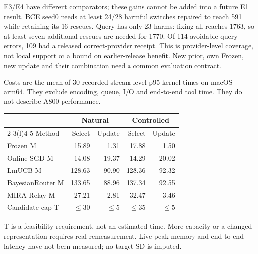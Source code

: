 \documentclass[10pt,letterpaper]{article}
\newcommand{\B}[1]{{\color{GuideBlue}#1}}
\newcommand{\note}[1]{{\fontsize{8.5}{10.5}\selectfont #1\par}}
\newcommand{\sect}[1]{\vspace{5pt}{\large\bfseries #1}\par\vspace{2pt}}
\newenvironment{clean}{\begin{center}\fontsize{9.5}{11.5}\selectfont\setlength{\tabcolsep}{6pt}\renewcommand{\arraystretch}{1.06}}{\end{center}}
\begin{document}
\note{E3/E4 have different comparators; these gains cannot be added into a future E1 result. BCE seed0 needs at least 24/28 harmful switches repaired to reach 591 while retaining its 16 rescues. Query has only 23 harms: fixing all reaches 1763, so at least seven additional rescues are needed for 1770. Of 114 avoidable query errors, 109 had a released correct-provider receipt. This is provider-level coverage, not local support or a bound on earlier-release benefit. New prior, own Frozen, new update and their combination need a common evaluation contract.}
\newpage
\sect{E5 / body Table 8: matched cost and feasibility}
Costs are the mean of 30 recorded stream-level p95 kernel times on macOS arm64.
They exclude encoding, queue, I/O and end-to-end tool time. They do not describe A800 performance.
\par\noindent\begin{minipage}{\linewidth}\end{minipage}\par
\begin{clean}\begin{tabular}{@{}lrrrr@{}}
\toprule
& \multicolumn{2}{c}{Natural} & \multicolumn{2}{c}{Controlled} \\ \cmidrule(lr){2-3}\cmidrule(l){4-5} Method & Select & Update & Select & Update \\
\midrule
Frozen M & 15.89 & 1.31 & 17.88 & 1.50 \\
Online SGD M & 14.08 & 19.37 & 14.29 & 20.02 \\
LinUCB M & 128.63 & 90.90 & 128.36 & 92.32 \\
BayesianRouter M & 133.65 & 88.96 & 137.34 & 92.55 \\
MIRA-Relay M & 27.21 & 2.81 & 32.47 & 3.46 \\
\B{Candidate cap T} & \B{$\leq30$} & \B{$\leq5$} & \B{$\leq35$} & \B{$\leq5$} \\
\bottomrule\end{tabular}\end{clean}
\note{T is a feasibility requirement, not an estimated time. More capacity or a changed representation requires real remeasurement. Live peak memory and end-to-end latency have not been measured; no target SD is imputed.}
\sect{E6 / body Table 7: coverage must match within each fitted policy}
\par\noindent\begin{minipage}{\linewidth}\end{minipage}\par
\end{document}
